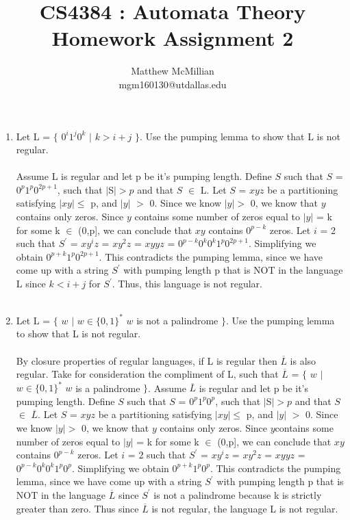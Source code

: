 \documentclass[12pt]{article}
\begin{document}
\title{CS4384 : Automata Theory\\Homework Assignment 2}
\author{Matthew McMillian\\mgm160130@utdallas.edu}
\maketitle


\begin{enumerate}
	
	\item Let L = $\{$ $0^i1^j0^k$ $|$ $k > i + j$ $\}$. Use the pumping lemma to show that L is not regular. \\ \\
	Assume L is regular and let p be it's pumping length. Define $S$ such that $S$ = $0^p1^p0^{2p+1}$, such that $|$S$| > p$ and that $S$ $\in$ L. Let $S$ = $xyz$ be a partitioning satisfying $|xy| \leq$ p, and $|y|$ $>$ 0. Since we know $|y| >$ 0, we know that $y$ contains only zeros. Since $y$ contains some number of zeros equal to $|y|$ = k for some k $\in$ (0,p], we can conclude that $xy$ contains $0^{p-k}$ zeros. Let $i$ = 2 such that $S^{'}$ = $xy^iz$ = $xy^2z$ = $xyyz$ = $0^{p-k}0^k0^k1^p0^{2p+1}$. Simplifying we obtain $0^{p+k}1^p0^{2p+1}$. This contradicts the pumping lemma, since we have come up with a string $S^{'}$ with pumping length p that is NOT in the language L since $k < i+j$ for $S^{'}$. Thus, this language is not regular. \\ \\
	
	\item Let L = $\{$ $w$ $|$ $w \in \{0,1\}^*$ $w$ is not a palindrome $\}$. Use the pumping lemma to show that L is not regular. \\ \\
	By closure properties of regular languages, if L is regular then $\overline{L}$ is also regular. Take for consideration the compliment of L, such that $\overline{L}$ = $\{$ $w$ $|$ $w \in \{0,1\}^*$ $w$ is a palindrome $\}$. Assume $\overline{L}$ is regular and let p be it's pumping length. Define $S$ such that $S$ = $0^p1^p0^p$, such that $|$S$| > p$ and that $S$ $\in$ $\overline{L}$. Let $S$ = $xyz$ be a partitioning satisfying $|xy| \leq$ p, and $|y|$ $>$ 0. Since we know $|y| >$ 0, we know that $y$ contains only zeros. Since $y $contains some number of zeros equal to $|y|$ = k for some k $\in$ (0,p], we can conclude that $xy$ contains $0^{p-k}$ zeros. Let $i$ = 2 such that $S^{'}$ = $xy^iz$ = $xy^2z$ = $xyyz$ = $0^{p-k}0^k0^k1^p0^{p}$. Simplifying we obtain $0^{p+k}1^p0^p$. This contradicts the pumping lemma, since we have come up with a string $S^{'}$ with pumping length p that is NOT in the language $\overline{L}$ since $S^{'}$ is not a palindrome because k is strictly greater than zero. Thus since $\overline{L}$ is not regular, the language L is not regular.
	\pagebreak
	

\end{enumerate}
\end{document}
